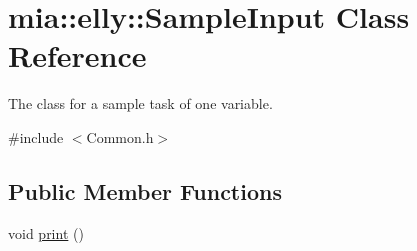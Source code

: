 \hypertarget{classmia_1_1elly_1_1_sample_input}{\section{mia\-:\-:elly\-:\-:Sample\-Input Class Reference}
\label{classmia_1_1elly_1_1_sample_input}
}


The class for a sample task of one variable.  




{\ttfamily \#include $<$Common.\-h$>$}

\subsection*{Public Member Functions}
\begin{DoxyCompactItemize}
\item 
void \hyperlink{classmia_1_1elly_1_1_sample_input_a4fe98adcf51c0ca80984a5abf8233d1d}{print} ()
\end{DoxyCompactItemize}
